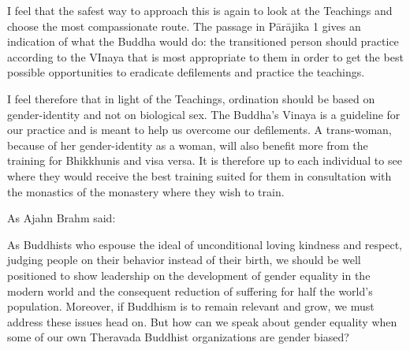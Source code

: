 I feel that the safest way to approach this is again to look at the Teachings and choose the most compassionate route. The passage in Pārājika 1 gives an indication of what the Buddha would do: the transitioned person should practice according to the VInaya that is most appropriate to them in order to get the best possible opportunities to eradicate defilements and practice the teachings.

I feel therefore that in light of the Teachings, ordination should be based on gender-identity and not on biological sex. The Buddha’s Vinaya is a guideline for our practice and is meant to help us overcome our defilements. A trans-woman, because of her gender-identity as a woman, will also benefit more from the training for Bhikkhunis and visa versa. It is therefore up to each individual to see where they would receive the best training suited for them in consultation with the monastics of the monastery where they wish to train.

As Ajahn Brahm said:

As Buddhists who espouse the ideal of unconditional loving kindness and respect, judging people on their behavior instead of their birth, we should be well positioned to show leadership on the development of gender equality in the modern world and the consequent reduction of suffering for half the world’s population. Moreover, if Buddhism is to remain relevant and grow, we must address these issues head on. But how can we speak about gender equality when some of our own Theravada Buddhist organizations are gender biased?